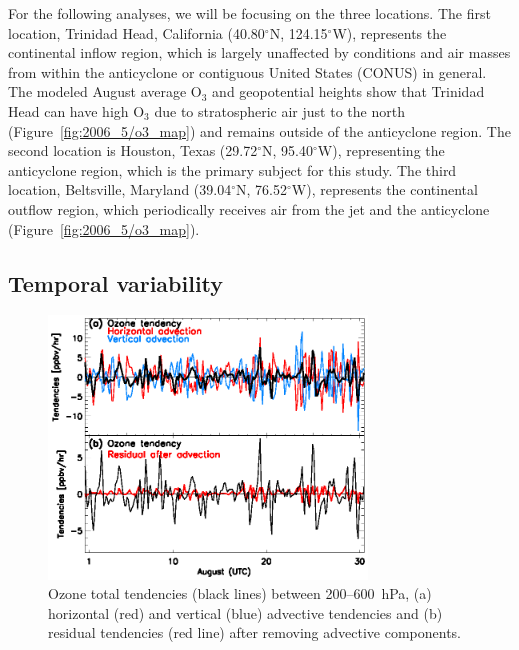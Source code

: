 For the following analyses, we will be focusing on the three locations.%
The first location,  Trinidad Head, California (40.80$^\circ$N, 124.15$^\circ$W), represents the
continental inflow region, which is largely unaffected by conditions and air masses from within the
anticyclone or contiguous United States (CONUS) in general. The modeled August average O$_3$ and geopotential heights
show that Trinidad Head can have high O$_3$ due to stratospheric air just to the north
(Figure~\ref{fig:2006_5/o3_map}) and remains outside of the anticyclone region.
The second location is Houston, Texas (29.72$^\circ$N,
95.40$^\circ$W), representing the anticyclone region, which is the primary subject for this study.
The third location, Beltsville, Maryland (39.04$^\circ$N, 76.52$^\circ$W), represents
the continental outflow region, which periodically receives air from the jet and
the anticyclone (Figure~\ref{fig:2006_5/o3_map}).

\subsection{Temporal variability}


 \begin{figure}
 \noindent\includegraphics[width=20pc]{figures/tendency_res.eps}
 \caption{Ozone total tendencies (black lines) between 200--600~hPa, (a)
horizontal (red) and vertical (blue) advective tendencies and (b)
residual tendencies (red line) after removing advective components.}
 \label{fig:tend_res}
 \end{figure}

